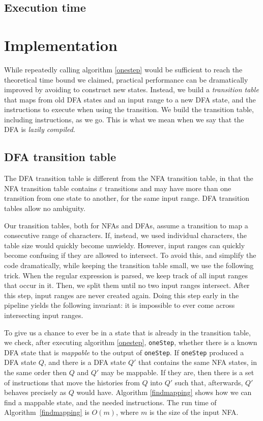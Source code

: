 \documentclass[11pt]{Thesis}
\theoremstyle{definition}
\begin{document}
\section{Execution time}


\chapter{Implementation}
While repeatedly calling algorithm \ref{onestep} would be sufficient
to reach the theoretical time bound we claimed, practical performance
can be dramatically improved by avoiding to construct new states.
Instead, we build a \emph{transition table} that maps from old DFA
states and an input range to a new DFA state, and the instructions
to execute when using the transition. We build the transition table,
including instructions, as we go. This is what we mean when we say
that the DFA is \emph{lazily compiled}. 

\section{DFA transition table}
The DFA transition table is different from the NFA transition table,
in that the NFA transition table contains $\varepsilon$ transitions and
may have more than one transition from one state to another, for
the same input range. DFA transition tables allow no ambiguity.

Our transition tables, both for NFAs and DFAs, assume a transition
to map a consecutive range of characters. If, instead, we used
individual characters, the table size would quickly become unwieldy.
However, input ranges can quickly become confusing if they are
allowed to intersect. To avoid this, and simplify the code dramatically,
while keeping the transition table small, we use the following
trick. When the regular expression is parsed, we keep track of all
input ranges that occur in it. Then, we split them until no two
input ranges intersect.  After this step, input ranges are never
created again.  Doing this step early in the pipeline yields the
following invariant: it is impossible to ever come across intersecting
input ranges.

To give us a chance to ever be in a state that is already in the
transition table, we check, after executing algorithm \ref{onestep},
\texttt{oneStep}, whether there is a known DFA state that is
\emph{mappable} to the output of \texttt{oneStep}.  If \texttt{oneStep}
produced a DFA state $Q$, and there is a DFA state $Q'$ that contains
the same NFA states, in the same order then $Q$ and $Q'$ may be
mappable.  If they are, then there is a set of instructions that
move the histories from $Q$ into $Q'$ such that, afterwards, $Q'$
behaves precisely as $Q$ would have. Algorithm \ref{findmapping}
shows how we can find a mappable state, and the needed instructions.
The run time of Algorithm~\ref{findmapping} is $O(m)$, where $m$
is the size of the input NFA.
\end{document}
